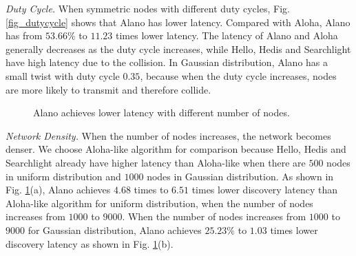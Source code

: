 \emph{Duty Cycle.}
When symmetric nodes with different duty cycles, Fig. \ref{fig_dutycycle} shows that Alano has lower latency. Compared with Aloha, Alano has from $53.66\%$ to $11.23$ times lower latency. The latency of Alano and Aloha generally decreases as the duty cycle increases, while Hello, Hedis and Searchlight have high latency due to the collision. In Gaussian distribution, Alano has a small twist with duty cycle $0.35$, because when the duty cycle increases, nodes are more likely to transmit and therefore collide.


\begin{figure}[!h]
\centering
{}
\hspace{0.01in}
\caption{Alano achieves lower latency with different number of nodes.}
\label{fig_node}
\end{figure}

\emph{Network Density.}
When the number of nodes increases, the network becomes denser. We choose Aloha-like algorithm for comparison because Hello, Hedis and Searchlight already have higher latency than Aloha-like when there are $500$ nodes in uniform distribution and $1000$ nodes in Gaussian distribution.
As shown in Fig. \ref{fig_node}(a), Alano achieves $4.68$ times to $6.51$ times lower discovery latency than Aloha-like algorithm for uniform distribution, when the number of nodes increases from $1000$ to $9000$.
When the number of nodes increases from $1000$ to $9000$ for Gaussian distribution, Alano achieves $25.23\%$ to $1.03$ times lower discovery latency as shown in Fig. \ref{fig_node}(b).  




